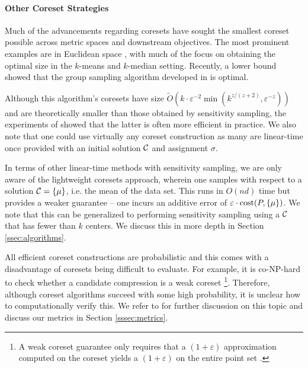 

\paragraph*{Other Coreset Strategies}
\label{ssec:clustering_prelim}

Much of the advancements regarding coresets have sought the smallest coreset possible across metric spaces and downstream objectives. The most prominent
examples are in Euclidean space \cite{BadoiuHI02, HaM04, Chen09, HuangV20, stoc22}, with much of the focus on obtaining the optimal size in the $k$-means and
$k$-median setting. Recently, a lower bound \cite{huangLB} showed that the group sampling algorithm developed in \cite{stoc21, stoc22} is optimal.

Although this algorithm's coresets have size $\tilde{O}(k\cdot \varepsilon^{-2} \min(k^{z/(z+2)},\varepsilon^{-z}))$ \cite{CLSSS22} and are theoretically smaller than
those obtained by sensitivity sampling, the experiments of \cite{chrisESA} showed that the latter is often more efficient in practice. We also note that one
could use virtually any coreset construction as many are linear-time once provided with an initial solution $\mathcal C$ and assignment $\sigma$.

In terms of other linear-time methods with sensitivity sampling, we are only aware of the lightweight coresets approach\cite{BachemL018}, wherein one
samples with respect to a solution $\mathcal C=\{\mu\}$, i.e. the mean of the data set. This runs in $O(nd)$ time but provides a weaker guarantee -- one incurs an
additive error of $\varepsilon\cdot \operatorname{cost}(P,\{\mu\})$.  We note that this can be generalized to performing sensitivity sampling using a $\mathcal C$ that has fewer
than $k$ centers. We discuss this in more depth in Section \ref{ssec:algorithms}.

All efficient coreset constructions are probabilistic and this comes with a disadvantage of coresets being difficult to evaluate. For example, it is co-NP-hard to
check whether a candidate compression is a weak coreset \footnote{A weak coreset guarantee only requires that a $(1+\varepsilon)$ approximation
computed on the coreset yields a $(1+\varepsilon)$ on the entire point set \cite{chrisESA}.}. Therefore, although coreset algorithms succeed with some high probability, it is
unclear how to computationally verify this. We refer to \cite{chrisESA} for further discussion on this topic and discuss our metrics in Section \ref{sssec:metrics}.

